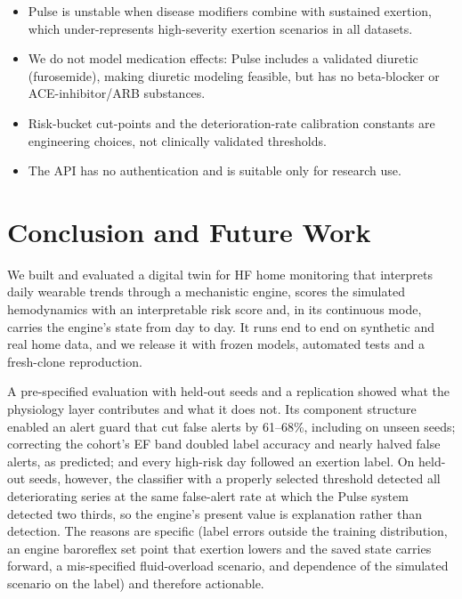 \documentclass[conference]{IEEEtran}
\begin{document}
\begin{itemize}
\item Pulse is unstable when disease modifiers combine with sustained exertion, which under-represents high-severity exertion scenarios in all datasets.
\item We do not model medication effects: Pulse includes a validated diuretic (furosemide), making diuretic modeling feasible, but has no beta-blocker or ACE-inhibitor/ARB substances.
\item Risk-bucket cut-points and the deterioration-rate calibration constants are engineering choices, not clinically validated thresholds.
\item The API has no authentication and is suitable only for research use.
\end{itemize}

\section{Conclusion and Future Work}
We built and evaluated a digital twin for HF home monitoring that interprets daily wearable trends through a mechanistic engine, scores the simulated hemodynamics with an interpretable risk score and, in its continuous mode, carries the engine's state from day to day. It runs end to end on synthetic and real home data, and we release it with frozen models, automated tests and a fresh-clone reproduction.

A pre-specified evaluation with held-out seeds and a replication showed what the physiology layer contributes and what it does not. Its component structure enabled an alert guard that cut false alerts by 61--68\%, including on unseen seeds; correcting the cohort's EF band doubled label accuracy and nearly halved false alerts, as predicted; and every high-risk day followed an exertion label. On held-out seeds, however, the classifier with a properly selected threshold detected all deteriorating series at the same false-alert rate at which the Pulse system detected two thirds, so the engine's present value is explanation rather than detection. The reasons are specific (label errors outside the training distribution, an engine baroreflex set point that exertion lowers and the saved state carries forward, a mis-specified fluid-overload scenario, and dependence of the simulated scenario on the label) and therefore actionable.
\end{document}
